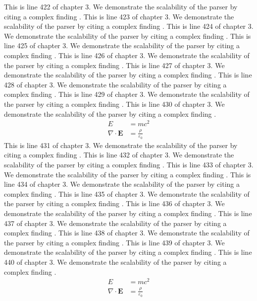 This is line 422 of chapter 3. We demonstrate the scalability of the parser by citing a complex finding \cite{ref3_422}.
This is line 423 of chapter 3. We demonstrate the scalability of the parser by citing a complex finding \cite{ref3_423}.
This is line 424 of chapter 3. We demonstrate the scalability of the parser by citing a complex finding \cite{ref3_424}.
This is line 425 of chapter 3. We demonstrate the scalability of the parser by citing a complex finding \cite{ref3_425}.
This is line 426 of chapter 3. We demonstrate the scalability of the parser by citing a complex finding \cite{ref3_426}.
This is line 427 of chapter 3. We demonstrate the scalability of the parser by citing a complex finding \cite{ref3_427}.
This is line 428 of chapter 3. We demonstrate the scalability of the parser by citing a complex finding \cite{ref3_428}.
This is line 429 of chapter 3. We demonstrate the scalability of the parser by citing a complex finding \cite{ref3_429}.
This is line 430 of chapter 3. We demonstrate the scalability of the parser by citing a complex finding \cite{ref3_430}.
\begin{align*}
  E &= mc^2 \\
  \nabla \cdot \mathbf{E} &= \frac{\rho}{\varepsilon_0}
\end{align*}
This is line 431 of chapter 3. We demonstrate the scalability of the parser by citing a complex finding \cite{ref3_431}.
This is line 432 of chapter 3. We demonstrate the scalability of the parser by citing a complex finding \cite{ref3_432}.
This is line 433 of chapter 3. We demonstrate the scalability of the parser by citing a complex finding \cite{ref3_433}.
This is line 434 of chapter 3. We demonstrate the scalability of the parser by citing a complex finding \cite{ref3_434}.
This is line 435 of chapter 3. We demonstrate the scalability of the parser by citing a complex finding \cite{ref3_435}.
This is line 436 of chapter 3. We demonstrate the scalability of the parser by citing a complex finding \cite{ref3_436}.
This is line 437 of chapter 3. We demonstrate the scalability of the parser by citing a complex finding \cite{ref3_437}.
This is line 438 of chapter 3. We demonstrate the scalability of the parser by citing a complex finding \cite{ref3_438}.
This is line 439 of chapter 3. We demonstrate the scalability of the parser by citing a complex finding \cite{ref3_439}.
This is line 440 of chapter 3. We demonstrate the scalability of the parser by citing a complex finding \cite{ref3_440}.
\begin{align*}
  E &= mc^2 \\
  \nabla \cdot \mathbf{E} &= \frac{\rho}{\varepsilon_0}
\end{align*}
